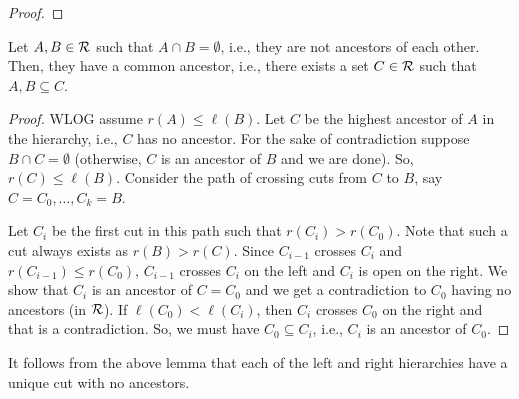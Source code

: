 \begin{proof}
\end{proof}

\begin{lemma}\label{lem:ABcommonancestor}
Let $A,B\in {\cal R}$ such that $A\cap B=\emptyset$, i.e., they are not ancestors of each other. Then, they have a common ancestor, i.e., there exists a set $C\in {\cal R}$ such that $A,B\subseteq C$.	
\end{lemma}
\begin{proof}
WLOG assume $r(A)\leq \ell(B)$.
Let $C$ be the highest ancestor of $A$ in the hierarchy, i.e., $C$ has no ancestor. For the sake of contradiction suppose $B\cap C=\emptyset$ (otherwise, $C$ is an ancestor of $B$ and we are done). So, $r(C)\leq \ell(B)$. Consider the path of crossing cuts from $C$ to $B$, say $C=C_0,\dots,C_k=B$. 

Let $C_i$ be the first cut in this path such that $r(C_i)>r(C_0)$. Note that such a cut always exists as $r(B)>r(C)$. 
Since $C_{i-1}$ crosses $C_i$ and $r(C_{i-1})\leq r(C_0)$, $C_{i-1}$ crosses $C_i$ on the left and $C_i$ is open on the  right. We show that $C_i$ is an ancestor of $C=C_0$ and we get a contradiction to $C_0$ having no ancestors (in ${\cal R}$).
If $\ell(C_0)<\ell(C_i)$, then $C_i$ crosses $C_0$ on the right and that is a contradiction. So, we must have $C_0\subseteq C_i$, i.e., $C_i$ is an ancestor of $C_0$.
\end{proof}
It follows from the above lemma that each of the left and right hierarchies have a unique cut  with no ancestors.

